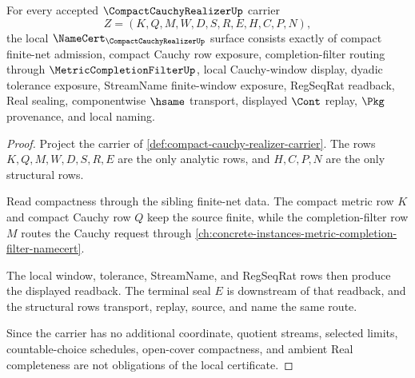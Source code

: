 \begin{theorem}
\label{thm:compact-cauchy-realizer-namecert-obligations}
For every accepted $\CompactCauchyRealizerUp$ carrier
$$
Z=(K,Q,M,W,D,S,R,E,H,C,P,N),
$$
the local $\NameCert_{\CompactCauchyRealizerUp}$ surface consists exactly of compact finite-net admission, compact Cauchy row exposure, completion-filter routing through $\MetricCompletionFilterUp$, local Cauchy-window display, dyadic tolerance exposure, StreamName finite-window exposure, RegSeqRat readback, Real sealing, componentwise $\hsame$ transport, displayed $\Cont$ replay, $\Pkg$ provenance, and local naming.
\end{theorem}
\begin{proof}
Project the carrier of \autoref{def:compact-cauchy-realizer-carrier}. The rows $K,Q,M,W,D,S,R,E$ are the only analytic rows, and $H,C,P,N$ are the only structural rows.

Read compactness through the sibling finite-net data. The compact metric row $K$ and compact Cauchy row $Q$ keep the source finite, while the completion-filter row $M$ routes the Cauchy request through \autoref{ch:concrete-instances-metric-completion-filter-namecert}.

The local window, tolerance, StreamName, and RegSeqRat rows then produce the displayed readback. The terminal seal $E$ is downstream of that readback, and the structural rows transport, replay, source, and name the same route.

Since the carrier has no additional coordinate, quotient streams, selected limits, countable-choice schedules, open-cover compactness, and ambient Real completeness are not obligations of the local certificate.
\end{proof}

